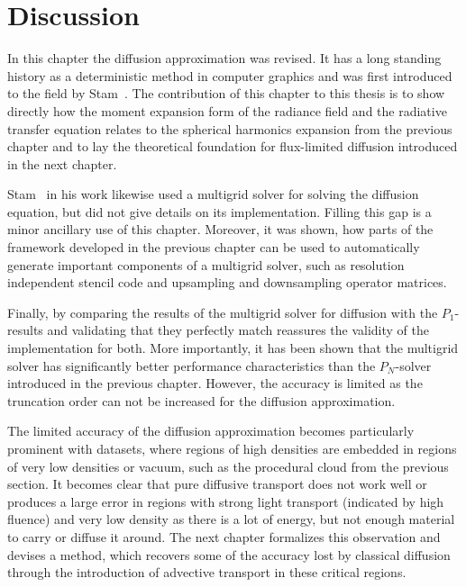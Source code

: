 \section{Discussion}
\label{sec:da_discussion}

In this chapter the diffusion approximation was revised. It has a long standing history as a deterministic method in computer graphics and was first introduced to the field by Stam~\cite{Stam95}. The contribution of this chapter to this thesis is to show directly how the moment expansion form of the radiance field and the radiative transfer equation relates to the spherical harmonics expansion from the previous chapter and to lay the theoretical foundation for flux-limited diffusion introduced in the next chapter.

Stam~\cite{Stam95} in his work likewise used a multigrid solver for solving the diffusion equation, but did not give details on its implementation. Filling this gap is a minor ancillary use of this chapter. Moreover, it was shown, how parts of the framework developed in the previous chapter can be used to automatically generate important components of a multigrid solver, such as resolution independent stencil code and upsampling and downsampling operator matrices.

Finally, by comparing the results of the multigrid solver for diffusion with the $P_1$-results and validating that they perfectly match reassures the validity of the implementation for both. More importantly, it has been shown that the multigrid solver has significantly better performance characteristics than the $P_N$-solver introduced in the previous chapter. However, the accuracy is limited as the truncation order can not be increased for the diffusion approximation.


The limited accuracy of the diffusion approximation becomes particularly prominent with datasets, where regions of high densities are embedded in regions of very low densities or vacuum, such as the procedural cloud from the previous section. It becomes clear that pure diffusive transport does not work well or produces a large error in regions with strong light transport (indicated by high fluence) and very low density as there is a lot of energy, but not enough material to carry or diffuse it around. The next chapter formalizes this observation and devises a method, which recovers some of the accuracy lost by classical diffusion through the introduction of advective transport in these critical regions.